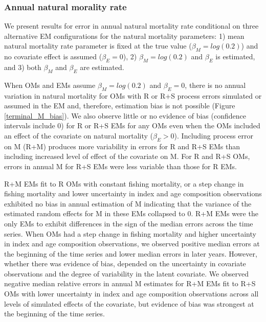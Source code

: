 \documentclass[
  12pt,
]{article}
\begin{document}
\hypertarget{annual-natural-morality-rate}{%
\subsubsection*{Annual natural morality rate}\label{annual-natural-morality-rate}}

We present results for error in annual natural mortality rate conditional on three alternative EM configurations for the natural mortality parameters: 1) mean natural mortality rate parameter is fixed at the true value (\(\beta_M = log(0.2)\)) and no covariate effect is assumed (\(\beta_E = 0\)), 2) \(\beta_M = log(0.2)\) and \(\beta_E\) is estimated, and 3) both \(\beta_M\) and \(\beta_E\) are estimated.

When OMs and EMs assume \(\beta_M = log(0.2)\) and \(\beta_E = 0\), there is no annual variation in natural mortality for OMs with R or R+S process errors simulated or assumed in the EM and, therefore, estimation bias is not possible (Figure \ref{terminal_M_bias}). We also observe little or no evidence of bias (confidence intervals include 0) for R or R+S EMs for any OMs even when the OMs included an effect of the covariate on natural mortality (\(\beta_E > 0\)). Including process error on M (R+M) produces more variability in errors for R and R+S EMs than including increased level of effect of the covariate on M. For R and R+S OMs, errors in annual M for R+S EMs were less variable than those for R EMs.

R+M EMs fit to R OMs with constant fishing mortality, or a step change in fishing mortality and lower uncertainty in index and age composition observations exhibited no bias in annual estimation of M indicating that the variance of the estimated random effects for M in these EMs collapsed to 0. R+M EMs were the only EMs to exhibit differences in the sign of the median errors across the time series. When OMs had a step change in fishing mortality and higher uncertainty in index and age composition observations, we observed positive median errors at the beginning of the time series and lower median errors in later years. However, whether there was evidence of bias, depended on the uncertainty in covariate observations and the degree of variability in the latent covariate. We observed negative median relative errors in annual M estimates for R+M EMs fit to R+S OMs with lower uncertainty in index and age composition observations across all levels of simulated effects of the covariate, but evidence of bias was strongest at the beginning of the time series.
\end{document}
